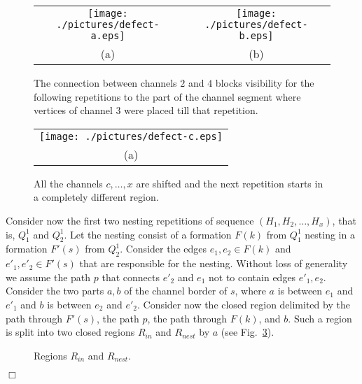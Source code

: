 \documentclass[a4paper,10pt]{llncs}
\renewenvironment{proof}
{{\bf Proof:}}{\hspace*{\fill}$\Box$\par\vspace{2mm}}
\begin{document}
\begin{proof}
\begin{figure}[ht]
\begin{center}
\begin{tabular}{c c}
\mbox{\texttt{[image: ./pictures/defect-a.eps]}} \hspace{0.2cm} &
\mbox{\texttt{[image: ./pictures/defect-b.eps]}} \\
(a) & (b)\\
\end{tabular}
\caption{The connection between channels $2$ and $4$ blocks visibility for the following repetitions to the part of the channel segment where vertices of channel $3$ were placed till that repetition.}
\label{fig:defects}
\end{center}
\end{figure}


\begin{figure}[ht]
\begin{center}
\begin{tabular}{c}
\mbox{\texttt{[image: ./pictures/defect-c.eps]}} \\
(a)\\
\end{tabular}
\caption{All the channels $c,\ldots,x$ are shifted and the next repetition starts in a completely different region.}
\label{fig:global-shift}
\end{center}
\end{figure}

Consider now the first two nesting repetitions of sequence $(H_1,H_2,\ldots,H_x)$, that is, $Q^1_1$ and $Q^1_2$. Let the nesting consist of a formation $F(k)$ from $Q^1_1$ nesting in a formation $F'(s)$ from $Q^1_2$.
Consider the edges $e_1,e_2 \in F(k)$ and $e'_1,e'_2 \in F'(s)$ that are responsible for the nesting.
Without loss of generality we assume the path $p$ that connects $e'_2$ and $e_1$ not to contain edges $e'_1,e_2$.
Consider the two parts $a,b$ of the channel border of $s$, where $a$ is between $e_1$ and $e'_1$ and $b$ is between  $e_2$ and $e'_2$. Consider now the closed region delimited by the path through $F'(s)$, the path $p$, the path through $F(k)$, and $b$. Such a region is split into two closed regions $R_{in}$ and $R_{nest}$ by $a$ (see Fig.~\ref{fig:nesting_formations}).

\begin{figure}[htb]
\caption{Regions $R_{in}$ and $R_{nest}$.}\label{fig:nesting_formations}
\end{figure}


\end{proof}
\end{document}
